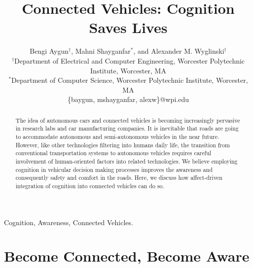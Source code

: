 \documentclass[journal, 11pt]{IEEEtran}
\begin{document}
\title{Connected Vehicles: Cognition Saves Lives}

\author{Bengi Aygun$^\dag$, Mahni Shayganfar$^*$, and Alexander M.
Wyglinski$^\dag$\\
\normalsize $^\dag$Department of Electrical and Computer Engineering, Worcester
Polytechnic Institute, Worcester, MA\\
\normalsize $^*$Department of Computer Science, Worcester Polytechnic Institute,
Worcester, MA\\
\normalsize \{baygun, mshayganfar, alexw\}@wpi.edu}

\maketitle

\begin{abstract}
The idea of autonomous cars and connected vehicles is becoming increasingly
pervasive in research labs and car manufacturing companies. It is inevitable
that roads are going to accommodate autonomous and semi-autonomous vehicles
in the near future. However, like other technologies filtering into humans
daily life, the transition from conventional transportation systems to
autonomous vehicles requires careful involvement of human-oriented factors into
related technologies. We believe employing cognition in vehicular decision
making processes improves the awareness and consequently safety and comfort in
the roads. Here, we discuss how affect-driven integration of cognition into
connected vehicles can do so.
\end{abstract}

\begin{keywords}
Cognition, Awareness, Connected Vehicles.
\end{keywords}%

\IEEEpeerreviewmaketitle

\section{Become Connected, Become Aware}
\end{document}
